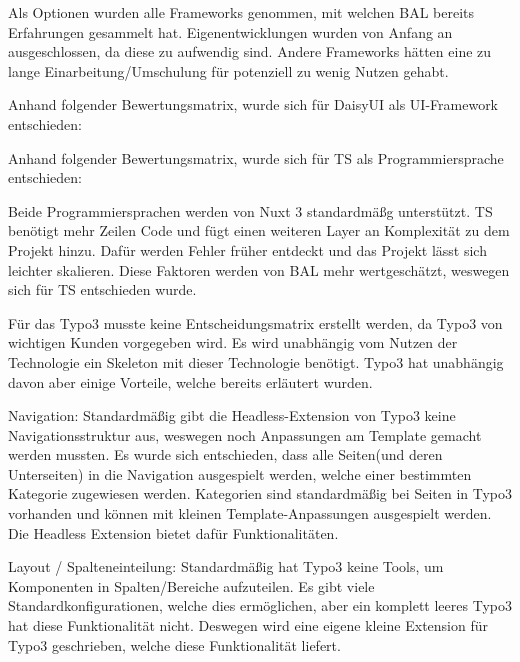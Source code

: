 
Als Optionen wurden alle Frameworks genommen, mit welchen \acs{BAL} bereits Erfahrungen gesammelt hat. Eigenentwicklungen wurden von Anfang an ausgeschlossen, da diese zu aufwendig sind. Andere Frameworks hätten eine zu lange Einarbeitung/Umschulung für potenziell zu wenig Nutzen gehabt.

Anhand folgender Bewertungsmatrix, wurde sich für DaisyUI als UI-Framework entschieden:


Anhand folgender Bewertungsmatrix, wurde sich für TS als Programmiersprache entschieden:


Beide Programmiersprachen werden von Nuxt 3 standardmäßg unterstützt. \acs{TS} benötigt mehr Zeilen Code und fügt einen weiteren Layer an Komplexität zu dem Projekt hinzu. Dafür werden Fehler früher entdeckt und das Projekt lässt sich leichter skalieren. Diese Faktoren werden von \acs{BAL} mehr wertgeschätzt, weswegen sich für \acs{TS} entschieden wurde.

Für das Typo3 musste keine Entscheidungsmatrix erstellt werden, da Typo3 von wichtigen Kunden vorgegeben wird. Es wird unabhängig vom Nutzen der Technologie ein Skeleton mit dieser Technologie benötigt. Typo3 hat unabhängig davon aber einige Vorteile, welche bereits erläutert wurden.

Navigation: Standardmäßig gibt die Headless-Extension von Typo3 keine Navigationsstruktur aus, weswegen noch Anpassungen am Template gemacht werden mussten. Es wurde sich entschieden, dass alle Seiten(und deren Unterseiten) in die Navigation ausgespielt werden, welche einer bestimmten Kategorie zugewiesen werden. Kategorien sind standardmäßig bei Seiten in Typo3 vorhanden und können mit kleinen Template-Anpassungen ausgespielt werden. Die Headless Extension bietet dafür Funktionalitäten.

Layout / Spalteneinteilung: Standardmäßig hat Typo3 keine Tools, um Komponenten in Spalten/Bereiche aufzuteilen. Es gibt viele Standardkonfigurationen, welche dies ermöglichen, aber ein komplett leeres Typo3 hat diese Funktionalität nicht. Deswegen wird eine eigene kleine Extension für Typo3 geschrieben, welche diese Funktionalität liefert.


